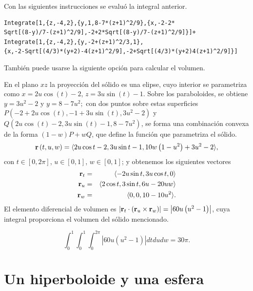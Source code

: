 Con las siguientes instrucciones se evaluó la integral anterior.

\begin{tcolorbox}[title=\bf Instrucción en \verb"Mathematica"]\begin{Verbatim}[formatcom=\letraverbatim]
Integrate[1,{z,-4,2},{y,1,8-7*(z+1)^2/9},{x,-2-2*
Sqrt[(8-y)/7-(z+1)^2/9],-2+2*Sqrt[(8-y)/7-(z+1)^2/9]}]+
Integrate[1,{z,-4,2},{y,-2+(z+1)^2/3,1},
{x,-2-Sqrt[(4/3)*(y+2)-4(z+1)^2/9],-2+Sqrt[(4/3)*(y+2)4(z+1)^2/9]}]
\end{Verbatim}
\end{tcolorbox}

También puede usarse la siguiente opción para calcular el volumen.

\enlargethispage*{\baselineskip}

En el plano $xz$ la proyección del sólido es una elipse, cuyo interior se parametriza como $x=2u\cos(t)-2$, $z=3u\sin(t)-1$. Sobre los parabo\-loides, se obtiene $y=3u^2-2$ y $y=8-7u^2;$
con dos puntos sobre estas superficies $P(-2+2u\cos (t) ,-1+3u\sin (t),3u^2-2)$ y
$Q(2u\cos (t)-2,3u\sin (t)-1,8-7u^2)$, se forma una combinación convexa de la forma $(1-w)P+wQ$, que define la función que parametriza el sólido.
\begin{equation*}
{\bf r}\left( t,u,w\right) =\langle 2u\cos t-2,3u\sin t-1,10w\left( 1-u^2\right) +3u^2-2 \rangle,
\end{equation*}
con $t\in [0,2\pi ]$, $u\in [0,1]$, $w\in [0,1]$;
y obtenemos los siguientes vectores
\begin{eqnarray*}
{\bf r}_{t}&=& \langle -2u\sin t,3u\cos t,0\rangle \\
{\bf r}_{u}&=& \langle 2\cos t,3\sin t,6u-20uw\rangle\\
{\bf r}_{w}&=& \langle 0,0,10-10u^2\rangle.
\end{eqnarray*}
El elemento diferencial de volumen es
$\left\vert {\bf r}_{t}\cdot \left({\bf r}_{u}\times {\bf r}_{w}\right) \right\vert =\left\vert 60u\left( u^2-1\right) \right\vert $,
cuya integral proporciona el volumen del sólido mencionado.

\[\int_{0}^{1}\int_{0}^{1}\int_{0}^{2\pi }\left\vert 60u\left( u^2-1\right)\right\vert dtdudw= 30\pi.\]

\section{Un hiperboloide y una esfera}  

